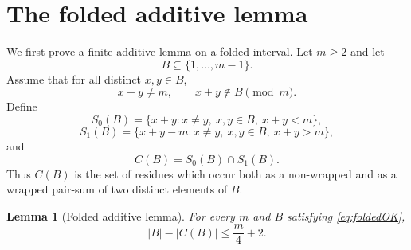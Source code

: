 \documentclass[11pt]{amsart}
\newtheorem{lemma}[theorem]{Lemma}
\theoremstyle{definition}
\begin{document}
\section{The folded additive lemma}

We first prove a finite additive lemma on a folded interval. Let $m\geq 2$ and let
\[
  B\subseteq \{1,\ldots,m-1\}.
\]
Assume that for all distinct $x,y\in B$,
\begin{equation}\label{eq:foldedOK}
  x+y\neq m,
  \qquad
  x+y\notin B\pmod m.
\end{equation}
Define
\[
  S_0(B)=\{x+y:x\neq y,\ x,y\in B,\ x+y<m\},
\]
\[
  S_1(B)=\{x+y-m:x\neq y,\ x,y\in B,\ x+y>m\},
\]
and
\[
  C(B)=S_0(B)\cap S_1(B).
\]
Thus $C(B)$ is the set of residues which occur both as a non-wrapped and as a wrapped pair-sum of two distinct elements of $B$.

\begin{lemma}[Folded additive lemma]\label{lem:folded}
For every $m$ and $B$ satisfying \eqref{eq:foldedOK},
\[
  |B|-|C(B)|\leq \frac m4+2.
\]
\end{lemma}
\end{document}

